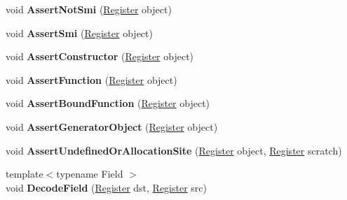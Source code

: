 \begin{DoxyCompactItemize}
\item 
\mbox{\label{classv8_1_1internal_1_1MacroAssembler_af70fc3cc2353f24bf73f868930906bcc}} 
void {\bfseries Assert\+Not\+Smi} (\mbox{\hyperlink{classv8_1_1internal_1_1Register}{Register}} object)
\item 
\mbox{\label{classv8_1_1internal_1_1MacroAssembler_aca8963bd0a98454d6ad0e4aa34d8cab8}} 
void {\bfseries Assert\+Smi} (\mbox{\hyperlink{classv8_1_1internal_1_1Register}{Register}} object)
\item 
\mbox{\label{classv8_1_1internal_1_1MacroAssembler_a6a0f31c1173192d0ff1e325d711e099f}} 
void {\bfseries Assert\+Constructor} (\mbox{\hyperlink{classv8_1_1internal_1_1Register}{Register}} object)
\item 
\mbox{\label{classv8_1_1internal_1_1MacroAssembler_aa8d13935f0543f10e23d7b44595f48bb}} 
void {\bfseries Assert\+Function} (\mbox{\hyperlink{classv8_1_1internal_1_1Register}{Register}} object)
\item 
\mbox{\label{classv8_1_1internal_1_1MacroAssembler_acbd0894b4e268684a580f99882497aed}} 
void {\bfseries Assert\+Bound\+Function} (\mbox{\hyperlink{classv8_1_1internal_1_1Register}{Register}} object)
\item 
\mbox{\label{classv8_1_1internal_1_1MacroAssembler_aa71ed557199e69728a422efb18e8fc65}} 
void {\bfseries Assert\+Generator\+Object} (\mbox{\hyperlink{classv8_1_1internal_1_1Register}{Register}} object)
\item 
\mbox{\label{classv8_1_1internal_1_1MacroAssembler_ac5a6e24ffce5d432cf0bf668b8460ff5}} 
void {\bfseries Assert\+Undefined\+Or\+Allocation\+Site} (\mbox{\hyperlink{classv8_1_1internal_1_1Register}{Register}} object, \mbox{\hyperlink{classv8_1_1internal_1_1Register}{Register}} scratch)
\item 
\mbox{\label{classv8_1_1internal_1_1MacroAssembler_a255a40c7f619cdf00e2b66de3afaf6f1}} 
{\footnotesize template$<$typename Field $>$ }\\void {\bfseries Decode\+Field} (\mbox{\hyperlink{classv8_1_1internal_1_1Register}{Register}} dst, \mbox{\hyperlink{classv8_1_1internal_1_1Register}{Register}} src)

\end{DoxyCompactItemize}
